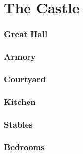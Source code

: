 \chapter{The Castle}



\pagebreak

\begin{multicols}{2}

\subsection{Great Hall}



\columnbreak

\subsection{Armory}



\pagebreak

\subsection{Courtyard}



\columnbreak

\subsection{Kitchen}



\pagebreak

\subsection{Stables}



\columnbreak

\subsection{Bedrooms}



\end{multicols}
